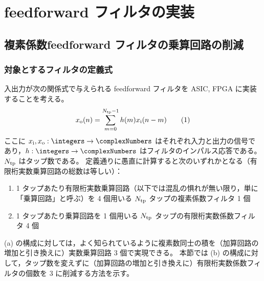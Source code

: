 \section{feedforward フィルタの実装}
    \subsection{複素係数feedforward フィルタの乗算回路の削減}
        \subsubsection{対象とするフィルタの定義式}
            \newcommand*{\xIn}{x_\text{i}}
            \newcommand*{\xOut}{x_\text{o}}
            入出力が次の関係式で与えられる feedforward フィルタを ASIC, FPGA に実装することを考える。
            \[ \xOut(n) = \sum_{m=0}^{\Ntp-1} h(m)\xIn(n-m) \tag{1} \]
            ここに $\xIn,\xOut:\integers\to\complexNumbers$ はそれぞれ入力と出力の信号であり，$h:\integers\to\complexNumbers$ はフィルタのインパルス応答である。$N_{\text{tp}}$ はタップ数である。
            定義通りに愚直に計算すると次のいずれかとなる（有限桁実数乗算回路の総数は等しい）：
            \begin{enumerate}[label=(\alph*)]
                \item 1 タップあたり有限桁実数乗算回路（以下では混乱の惧れが無い限り，単に「乗算回路」と呼ぶ）を 4 個用いる $N_{\text{tp}}$ タップの複素係数フィルタ 1 個
                \item 1 タップあたり乗算回路を 1 個用いる $N_{\text{tp}}$ タップの有限桁実数係数フィルタ 4 個
            \end{enumerate}
            (a) の構成に対しては，よく知られているように複素数同士の積を（加算回路の増加と引き換えに）実数乗算回路 3 個で実現できる。
            本節では (b) の構成に対して，タップ数を変えずに（加算回路の増加と引き換えに）有限桁実数係数フィルタの個数を 3 に削減する方法を示す。
